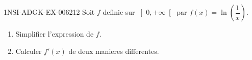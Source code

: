 \begin{exercice}{1NSI-ADGK-EX-006}{2}{12}
Soit $f$ definie sur $\left]0, +\infty\right[$ par $f(x) = \ln\!\left(\dfrac{1}{x}\right)$.
\begin{enumerate}
  \item Simplifier l'expression de $f$.
  \item Calculer $f'(x)$ de deux manieres differentes.
\end{enumerate}

\end{exercice}
